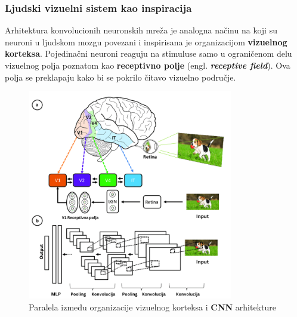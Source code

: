 \documentclass[12pt]{article}
\begin{document}
   \subsubsection{Ljudski vizuelni sistem kao inspiracija}
   Arhitektura konvolucionih neuronskih mreža je analogna načinu na koji su neuroni u
   ljudskom mozgu povezani i inspirisana je organizacijom \textbf{vizuelnog korteksa}. 
   Pojedinačni neuroni reaguju na stimuluse samo u ograničenom delu vizuelnog polja 
   poznatom kao \textbf{receptivno polje} (engl. \textbf{\textit{receptive field}}). 
   Ova polja se preklapaju kako bi se pokrilo čitavo vizuelno područje.


   \begin{figure}[h!]
      \centering
      \vspace{1.5cm} %
      \includegraphics[width=0.8\textwidth]{visual_cortex.png}
      \caption{Paralela između organizacije vizuelnog korteksa i \textbf{CNN} arhitekture}
      \label{fig:visual_cortex}
   \end{figure}

   \newpage
\end{document}
